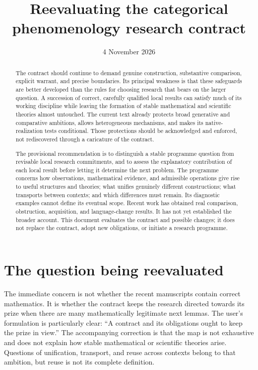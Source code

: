 \documentclass[11pt]{article}
\title{Reevaluating the categorical phenomenology research contract}
\author{}
\date{4 November 2026}
\begin{document}
\maketitle

\begin{abstract}
The contract should continue to demand genuine construction, substantive comparison, explicit warrant, and precise boundaries. Its principal weakness is that these safeguards are better developed than the rules for choosing research that bears on the larger question. A succession of correct, carefully qualified local results can satisfy much of its working discipline while leaving the formation of stable mathematical and scientific theories almost untouched. The current text already protects broad generative and comparative ambitions, allows heterogeneous mechanisms, and makes its native-realization tests conditional. Those protections should be acknowledged and enforced, not rediscovered through a caricature of the contract.

The provisional recommendation is to distinguish a stable programme question from revisable local research commitments, and to assess the explanatory contribution of each local result before letting it determine the next problem. The programme concerns how observations, mathematical evidence, and admissible operations give rise to useful structures and theories; what unifies genuinely different constructions; what transports between contexts; and which differences must remain. Its diagnostic examples cannot define its eventual scope. Recent work has obtained real comparison, obstruction, acquisition, and language-change results. It has not yet established the broader account. This document evaluates the contract and possible changes; it does not replace the contract, adopt new obligations, or initiate a research programme.
\end{abstract}

\tableofcontents

\section{The question being reevaluated}
\label{sec:question}

The immediate concern is not whether the recent manuscripts contain correct mathematics. It is whether the contract keeps the research directed towards its prize when there are many mathematically legitimate next lemmas. The user's formulation is particularly clear: ``A contract and its obligations ought to keep the prize in view.'' The accompanying correction is that the map is not exhaustive and does not explain how stable mathematical or scientific theories arise. Questions of unification, transport, and reuse across contexts belong to that ambition, but reuse is not its complete definition.
\end{document}
